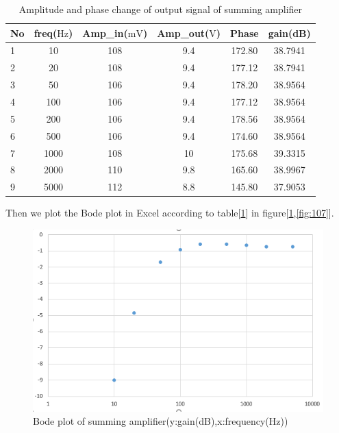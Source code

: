\begin{table}[!htbp]
	\centering
	\caption{Amplitude and phase change of output signal of summing amplifier}
	\begin{tabular}{lccccc}
		\toprule
		No &freq($\si{\hertz}$) &Amp\_in($\si{\milli\volt}$)&Amp\_out($\si{\volt}$)&Phase&gain(dB)\\
		\midrule
		1	&10		&108	&9.4	&172.80	&38.7941\\
		2	&20		&108	&9.4	&177.12	&38.7941\\
		3	&50		&106	&9.4	&178.20	&38.9564\\
		4	&100	&106	&9.4	&177.12	&38.9564\\
		5	&200	&106	&9.4	&178.56	&38.9564\\
		6	&500	&106	&9.4	&174.60	&38.9564\\
		7	&1000	&108	&10		&175.68	&39.3315\\
		8	&2000	&110	&9.8	&165.60	&38.9967\\
		9	&5000	&112	&8.8	&145.80	&37.9053\\
		\bottomrule
	\end{tabular}
	\label{tab:sumamp}
\end{table}

\phantom{ } Then we plot the Bode plot in Excel according to table[\ref{tab:sumamp}] in figure[\ref{fig:106},\ref{fig:107}].
\begin{figure}[!htbp]
	\centering 
	\begin{framed}
		\includegraphics[width=\linewidth]{images/1_5.PNG} 
		\caption{Bode plot of summing amplifier(y:gain(dB),x:frequency(Hz))}
		\label{fig:106} 
	\end{framed}
\end{figure} 

